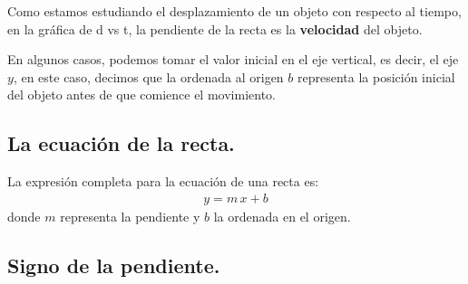 \documentclass[14pt]{extarticle}
\newcommand{\textocolor}[2]{\textbf{\textcolor{#1}{#2}}}
\begin{document}
Como estamos estudiando el desplazamiento de un objeto con respecto al tiempo, en la gráfica de d vs t, la pendiente de la recta es la \textocolor{cobalt}{velocidad} del objeto.

En algunos casos, podemos tomar el valor inicial en el eje vertical, es decir, el eje $y$, en este caso, decimos que la ordenada al origen $b$ representa la posición inicial del objeto antes de que comience el movimiento.
\begin{figure}[H]
    \centering
\end{figure}

\subsection{La ecuación de la recta.}

La expresión completa para la ecuación de una recta es:
\begin{align*}
y = m \, x + b
\end{align*}
donde $m$ representa la pendiente y $b$ la ordenada en el origen.

\subsection{Signo de la pendiente.}
\end{document}

